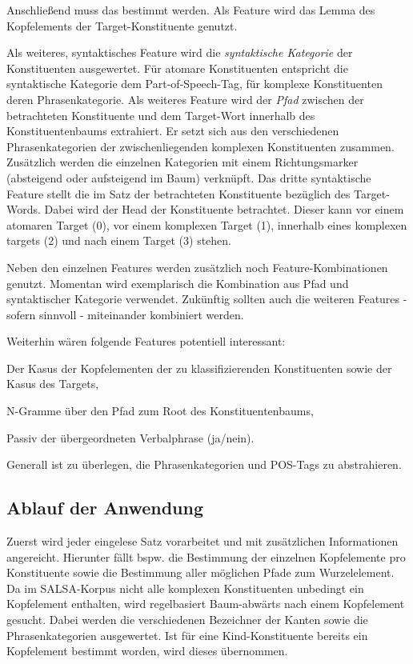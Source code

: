 \documentclass[12pt]{article}
\begin{document}
Anschließend muss das  bestimmt werden. Als Feature
wird das Lemma des Kopfelements der Target-Konstituente genutzt.

Als weiteres, syntaktisches Feature wird die \textit{syntaktische Kategorie} der
Konstituenten ausgewertet. Für atomare Konstituenten entspricht die syntaktische
Kategorie dem Part-of-Speech-Tag, für komplexe Konstituenten deren
Phrasenkategorie. 
Als weiteres Feature wird der \textit{Pfad} zwischen der betrachteten Konstituente und dem Target-Wort
innerhalb des Konstituentenbaums extrahiert. Er setzt sich aus den verschiedenen
Phrasenkategorien der zwischenliegenden komplexen Konstituenten zusammen.
Zusätzlich werden die einzelnen Kategorien mit einem Richtungsmarker
(absteigend oder aufsteigend im Baum) verknüpft.
Das dritte syntaktische Feature stellt die  im Satz der
betrachteten Konstituente bezüglich des Target-Words. Dabei wird der Head der Konstituente
betrachtet. Dieser kann vor einem atomaren Target (0), vor einem komplexen
Target (1), innerhalb eines komplexen targets (2) und nach einem Target (3)
stehen.

Neben den einzelnen Features werden zusätzlich noch Feature-Kombinationen
genutzt. Momentan wird exemplarisch die Kombination aus Pfad und syntaktischer
Kategorie verwendet. Zukünftig sollten auch die weiteren Features - sofern
sinnvoll - miteinander kombiniert werden.

Weiterhin wären folgende Features potentiell interessant:
\begin{enumeration}
\item Der Kasus der Kopfelementen der zu klassifizierenden Konstituenten sowie
der Kasus des Targets,
\item N-Gramme über den Pfad zum Root des Konstituentenbaums,
\item Passiv der übergeordneten Verbalphrase (ja/nein).
\end{enumeration}

Generall ist zu überlegen, die Phrasenkategorien und POS-Tags zu abstrahieren.

\subsection{Ablauf der Anwendung}

Zuerst wird jeder eingelese Satz vorarbeitet und mit zusätzlichen Informationen
angereicht. Hierunter fällt bspw. die Bestimmung der einzelnen Kopfelemente pro
Konstituente sowie die Bestimmung aller möglichen Pfade zum Wurzelelement. Da im
SALSA-Korpus nicht alle komplexen Konstituenten unbedingt ein Kopfelement
enthalten, wird regelbasiert Baum-abwärts nach einem Kopfelement gesucht. Dabei
werden die verschiedenen Bezeichner der Kanten sowie die Phrasenkategorien ausgewertet.
Ist für eine Kind-Konstituente bereits ein Kopfelement bestimmt worden, wird
dieses übernommen.
\end{document}
